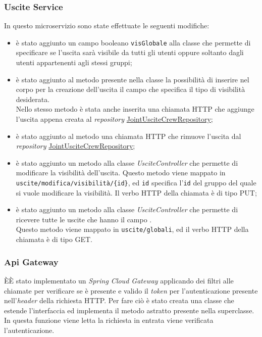 \subsubsection{Uscite Service}
In questo \gls{microservizio} sono state effettuate le seguenti modifiche: 
\begin{itemize}
    \item è stato aggiunto un campo booleano \texttt{visGlobale} alla classe  che permette di specificare se l'uscita sarà visibile da tutti gli utenti oppure soltanto dagli utenti appartenenti agli stessi gruppi;
    \item è stato aggiunto al metodo  presente nella classe  la possibilità di inserire nel corpo per la creazione dell'uscita il campo che specifica il tipo di visibilità desiderata. \\
    Nello stesso metodo è stata anche inserita una chiamata HTTP che aggiunge l'uscita appena creata al \textit{repository} \hyperref[JointUsciteCrewRepository]{JointUsciteCrewRepository};
    \item è stato aggiunto al metodo  una chiamata HTTP che rimuove l'uscita dal \textit{repository} \hyperref[JointUsciteCrewRepository]{JointUsciteCrewRepository};
    \item è stato aggiunto un metodo   alla classe \textit{UsciteController} che permette di modificare la visibilità dell'uscita.
    Questo metodo viene mappato in \texttt{uscite/modifica/visibilità/\{id\}}, ed \texttt{id} specifica l'\texttt{id} del gruppo del quale si vuole modificare la visibilità. Il verbo HTTP della chiamata è di tipo PUT; 
    \item è stato aggiunto un metodo   alla classe \textit{UsciteController} che permette di ricevere tutte le uscite che hanno il campo . \\
    Questo metodo viene mappato in \texttt{uscite/globali}, ed il verbo HTTP della chiamata è di tipo GET.
\end{itemize}


\subsubsection{Api Gateway}
ÈÈ stato implementato un \textit{Spring Cloud Gateway} applicando dei filtri alle chiamate per verificare se è presente e valido il \textit{token} per l'autenticazione  presente nell'\textit{header} della richiesta HTTP.
Per fare ciò è stato creata una classe  che estende l'interfaccia  ed implementa il metodo astratto  presente nella superclasse. In questa funzione viene letta la richiesta in entrata viene verificata l'autenticazione.

